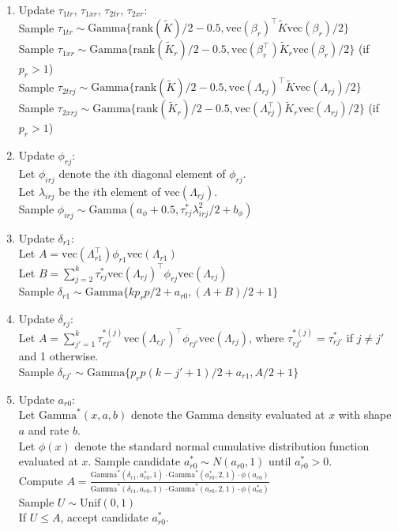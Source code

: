 \documentclass[useAMS,referee,usenatbib]{biom}
\newcommand{\vect}{\text{vec}}
\begin{document}
\begin{enumerate}
	\item Update $\tau_{1tr}$, $\tau_{1xr}$, $\tau_{2tr}$, $\tau_{2xr}$:\\
	Sample $\tau_{1tr} \sim \text{Gamma}\{\text{rank}(\tilde{K})/2 - 0.5, \vect(\beta_{r})^{\top}\tilde{K}\vect(\beta_{r})/2\}$\\
	Sample $\tau_{1xr} \sim \text{Gamma}\{\text{rank}(\tilde{K}_{r})/2 - 0.5, \vect(\beta_{r}^{\top})\tilde{K}_{r}\vect(\beta_{r})/2\}$ (if $p_{r} > 1$)\\
	Sample $\tau_{2trj} \sim \text{Gamma}\{\text{rank}(\tilde{K})/2 - 0.5, \vect(\Lambda_{rj})^{\top}\tilde{K}\vect(\Lambda_{rj})/2\}$\\
	Sample $\tau_{2xrj} \sim \text{Gamma}\{\text{rank}(\tilde{K}_{r})/2 - 0.5, \vect(\Lambda_{rj}^{\top})\tilde{K}_{r}\vect(\Lambda_{rj})/2\}$ (if $p_{r} > 1$)
	
	\item Update $\phi_{rj}$:\\
	Let $\phi_{irj}$ denote the $i$th diagonal element of $\phi_{rj}$. \\
	Let $\lambda_{irj}$ be the $i$th element of $\vect(\Lambda_{rj})$.\\
	Sample $\phi_{irj} \sim \text{Gamma}(a_{\phi} + 0.5, \tau^{*}_{rj}\lambda_{irj}^{2}/2 + b_{\phi})$
	
	\item Update $\delta_{r1}$:\\
	Let $A = \vect(\Lambda_{r1}^{\top})\phi_{r1}\vect(\Lambda_{r1})$\\
	Let $B = \sum_{j=2}^{k}\tau^{*}_{rj} \vect(\Lambda_{rj})^{\top}\phi_{rj}\vect(\Lambda_{rj})$\\
	Sample $\delta_{r1} \sim \text{Gamma}\{k p_{r} p/2 + a_{r0}, (A + B)/2+ 1\}$
	
	\item Update $\delta_{rj}$: \\
	Let $A = \sum_{j'=1}^{k}\tau^{*(j)}_{rj'}\vect(\Lambda_{rj'})^{\top}\phi_{rj'}\vect(\Lambda_{rj})$, where $\tau^{*(j)}_{rj'} = \tau^{*}_{rj'}$ if $j\neq j'$ and 1 otherwise.\\
	Sample $\delta_{rj'} \sim \text{Gamma}\{p_{r}p(k-j'+1)/2 + a_{r1}, A/2 + 1\}$
	
	\item Update $a_{r0}$:\\
	Let $\text{Gamma}^{*}(x,a,b)$ denote the Gamma density evaluated at $x$ with shape $a$ and rate $b$.\\
	Let $\phi(x)$ denote the standard normal cumulative distribution function evaluated at $x$.
	Sample candidate $a_{r0}^{*}\sim N(a_{r0}, 1)$ until $a_{r0}^{*} > 0$.\\
	Compute $A = \displaystyle\frac{\text{Gamma}^{*}(\delta_{r1}, a_{r0}^{*}, 1)\cdot\text{Gamma}^{*}(a^{*}_{r0}, 2, 1)\cdot \phi(a_{r0})}{\text{Gamma}^{*}(\delta_{r1}, a_{r0}, 1)\cdot\text{Gamma}^{*}(a_{r0}, 2, 1)\cdot \phi(a_{r0}^{*})}$\\
	Sample $U \sim \text{Unif}(0, 1)$\\
	If $U\leq A$, accept candidate $a_{r0}^{*}$. 
	

\end{enumerate}
\end{document}
